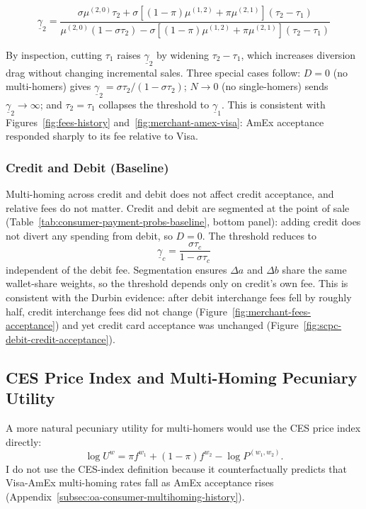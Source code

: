 \documentclass[main.tex]{subfiles}
\begin{document}
\begin{equation}
\underline{\gamma}_2 = \frac{\sigma\mu^{(2,0)}\tau_2 + \sigma\left[(1-\pi)\mu^{(1,2)} + \pi\mu^{(2,1)}\right](\tau_2-\tau_1)}{\mu^{(2,0)}\left(1-\sigma\tau_2\right) - \sigma\left[(1-\pi)\mu^{(1,2)} + \pi\mu^{(2,1)}\right](\tau_2-\tau_1)} \label{eq:amex-accept-threshold}
\end{equation}

By inspection, cutting $\tau_1$ raises $\underline{\gamma}_2$ by widening $\tau_2 - \tau_1$, which increases diversion drag without changing incremental sales. Three special cases follow: $D = 0$ (no multi-homers) gives $\underline{\gamma}_2 = \sigma\tau_2/(1-\sigma\tau_2)$; $N \to 0$ (no single-homers) sends $\underline{\gamma}_2 \to \infty$; and $\tau_2 = \tau_1$ collapses the threshold to $\underline{\gamma}_1$.
This is consistent with Figures~\ref{fig:fees-history} and~\ref{fig:merchant-amex-visa}: AmEx acceptance responded sharply to its fee relative to Visa.


\subsubsection{Credit and Debit (Baseline)}\label{subsubsec:oa-credit-debit-baseline}

Multi-homing across credit and debit does not affect credit acceptance, and relative fees do not matter.
Credit and debit are segmented at the point of sale (Table~\ref{tab:consumer-payment-probs-baseline}, bottom panel): adding credit does not divert any spending from debit, so $D = 0$.
The threshold reduces to
\[
\underline{\gamma}_c = \frac{\sigma\tau_c}{1-\sigma\tau_c}
\]
independent of the debit fee.
Segmentation ensures $\Delta a$ and $\Delta b$ share the same wallet-share weights, so the threshold depends only on credit's own fee.
This is consistent with the Durbin evidence: after debit interchange fees fell by roughly half, credit interchange fees did not change (Figure~\ref{fig:merchant-fees-acceptance}) and yet credit card acceptance was unchanged (Figure~\ref{fig:scpc-debit-credit-acceptance}).

\subsection{CES Price Index and Multi-Homing Pecuniary Utility}\label{subsec:oa-ces-price-index}

A more natural pecuniary utility for multi-homers would use the CES price index directly:
\begin{equation*}
\log U^w = \pi f^{w_1} + (1-\pi) f^{w_2} - \log P^{(w_1,w_2)}.
\end{equation*}
I do not use the CES-index definition because it counterfactually predicts that Visa-AmEx multi-homing rates fall as AmEx acceptance rises (Appendix~\ref{subsec:oa-consumer-multihoming-history}).
\end{document}
